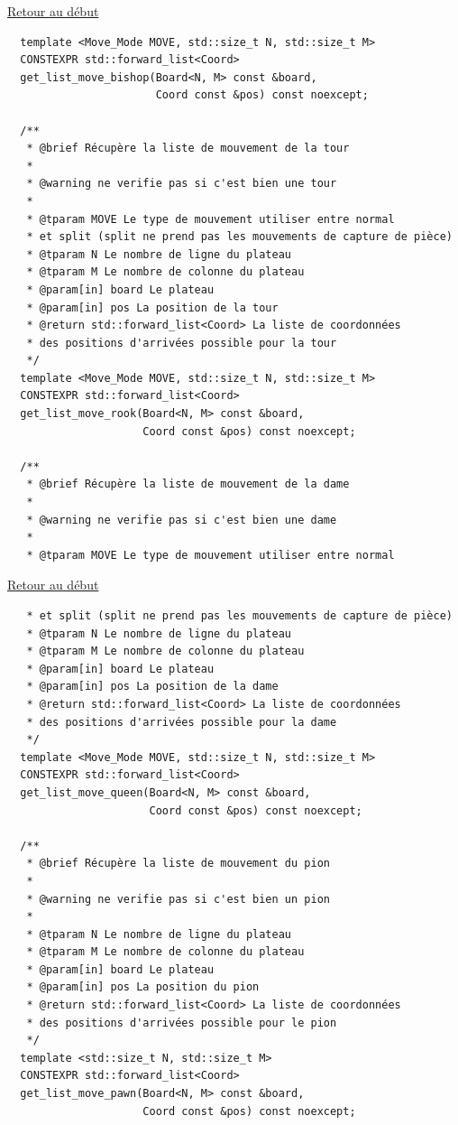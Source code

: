 {\begin{frame}[fragile]
\hyperlink{conclusion}{Retour au début}\newline
\begin{verbatim}
  template <Move_Mode MOVE, std::size_t N, std::size_t M>
  CONSTEXPR std::forward_list<Coord>
  get_list_move_bishop(Board<N, M> const &board,
                       Coord const &pos) const noexcept;

  /**
   * @brief Récupère la liste de mouvement de la tour
   *
   * @warning ne verifie pas si c'est bien une tour
   *
   * @tparam MOVE Le type de mouvement utiliser entre normal
   * et split (split ne prend pas les mouvements de capture de pièce)
   * @tparam N Le nombre de ligne du plateau
   * @tparam M Le nombre de colonne du plateau
   * @param[in] board Le plateau
   * @param[in] pos La position de la tour
   * @return std::forward_list<Coord> La liste de coordonnées
   * des positions d'arrivées possible pour la tour
   */
  template <Move_Mode MOVE, std::size_t N, std::size_t M>
  CONSTEXPR std::forward_list<Coord>
  get_list_move_rook(Board<N, M> const &board,
                     Coord const &pos) const noexcept;

  /**
   * @brief Récupère la liste de mouvement de la dame
   *
   * @warning ne verifie pas si c'est bien une dame
   *
   * @tparam MOVE Le type de mouvement utiliser entre normal
\end{verbatim}
\end{frame}

\begin{frame}[fragile]
\hyperlink{conclusion}{Retour au début}\newline
\begin{verbatim}
   * et split (split ne prend pas les mouvements de capture de pièce)
   * @tparam N Le nombre de ligne du plateau
   * @tparam M Le nombre de colonne du plateau
   * @param[in] board Le plateau
   * @param[in] pos La position de la dame
   * @return std::forward_list<Coord> La liste de coordonnées
   * des positions d'arrivées possible pour la dame
   */
  template <Move_Mode MOVE, std::size_t N, std::size_t M>
  CONSTEXPR std::forward_list<Coord>
  get_list_move_queen(Board<N, M> const &board,
                      Coord const &pos) const noexcept;

  /**
   * @brief Récupère la liste de mouvement du pion
   *
   * @warning ne verifie pas si c'est bien un pion
   *
   * @tparam N Le nombre de ligne du plateau
   * @tparam M Le nombre de colonne du plateau
   * @param[in] board Le plateau
   * @param[in] pos La position du pion
   * @return std::forward_list<Coord> La liste de coordonnées
   * des positions d'arrivées possible pour le pion
   */
  template <std::size_t N, std::size_t M>
  CONSTEXPR std::forward_list<Coord>
  get_list_move_pawn(Board<N, M> const &board,
                     Coord const &pos) const noexcept;


\end{verbatim}
\end{frame}}
